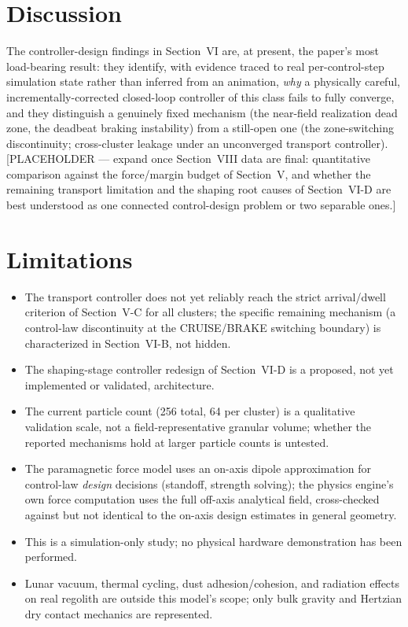 \documentclass[journal]{IEEEtran}
\begin{document}
\section{Discussion}
The controller-design findings in Section~VI are, at present, the paper's
most load-bearing result: they identify, with evidence traced to real
per-control-step simulation state rather than inferred from an animation,
\emph{why} a physically careful, incrementally-corrected closed-loop
controller of this class fails to fully converge, and they distinguish a
genuinely fixed mechanism (the near-field realization dead zone, the
deadbeat braking instability) from a still-open one (the zone-switching
discontinuity; cross-cluster leakage under an unconverged transport
controller). [PLACEHOLDER --- expand once Section~VIII data are final:
quantitative comparison against the force/margin budget of Section~V,
and whether the remaining transport limitation and the shaping root
causes of Section~VI-D are best understood as one connected control-design
problem or two separable ones.]

\section{Limitations}
\begin{itemize}
\item The transport controller does not yet reliably reach the strict
arrival/dwell criterion of Section~V-C for all clusters; the specific
remaining mechanism (a control-law discontinuity at the CRUISE/BRAKE
switching boundary) is characterized in Section~VI-B, not hidden.
\item The shaping-stage controller redesign of Section~VI-D is a proposed,
not yet implemented or validated, architecture.
\item The current particle count (256 total, 64 per cluster) is a
qualitative validation scale, not a field-representative granular volume;
whether the reported mechanisms hold at larger particle counts is untested.
\item The paramagnetic force model uses an on-axis dipole approximation for
control-law \emph{design} decisions (standoff, strength solving); the
physics engine's own force computation uses the full off-axis analytical
field, cross-checked against but not identical to the on-axis design
estimates in general geometry.
\item This is a simulation-only study; no physical hardware demonstration
has been performed.
\item Lunar vacuum, thermal cycling, dust adhesion/cohesion, and radiation
effects on real regolith are outside this model's scope; only bulk gravity
and Hertzian dry contact mechanics are represented.
\end{itemize}
\end{document}
